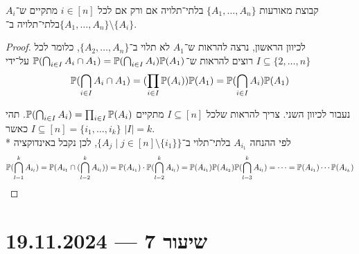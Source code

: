 \begin{proposition}
	קבוצת מאורעות $\{A_1, \dots, A_n\}$ בלתי־תלויה אם ורק אם לכל $i \in [n]$ מתקיים ש־$A_i$ בלתי־תלויה ב־$\{A_1, \dots, A_n\} \setminus \{A_i\}$.
\end{proposition}
\begin{proof}
	לכיוון הראשון, נרצה להראות ש־$A_1$ לא תלוי ב־$\{A_2, \dots, A_n\}$, כלומר לכל $I \subseteq \{2, \dots, n\}$ רוצים להראות ש־$\mathbb{P}(\bigcap_{i \in I} A_i \cap A_1) = \mathbb{P}(\bigcap_{i \in I} A_i) \mathbb{P}(A_1)$ על־ידי
	\[
		\mathbb{P}(\bigcap_{i \in I} A_i \cap A_1)
		= (\prod_{i \in I} \mathbb{P}(A_i)) \mathbb{P}(A_1)
		= \mathbb{P}(\bigcap_{i \in I} A_i) \mathbb{P}(A_1)
	\]

	נעבור לכיוון השני.
	צריך להראות שלכל $I \subseteq [n]$ מתקיים $\mathbb{P}(\bigcap_{i \in I} A_i) = \prod_{i \in I} \mathbb{P}(A_i)$.
	תהי $I \subseteq [n] = \{ i_1, \dots, i_k \}$ כאשר $|I| = k$. \\*
	לפי ההנחה $A_{i_1}$ בלתי־תלוי ב־$\{ A_j \mid j \in [n] \setminus \{ i_1 \}\}$, לכן נקבל באינדוקציה
	\[
		\mathbb{P}(\bigcap_{l = 1}^k A_{i_l})
		= \mathbb{P}(A_{i_1} \cap (\bigcap_{l = 2}^k A_{i_l}))
		= \mathbb{P}(A_{i_1}) \cdot \mathbb{P}(\bigcap_{l = 2}^k A_{i_l})
		= \mathbb{P}(A_{i_1}) \mathbb{P}(A_{i_2}) \mathbb{P}(\bigcap_{l = 3}^k A_{i_l})
		= \cdots = \mathbb{P}(A_{i_1}) \cdots \mathbb{P}(A_{i_k})
	\]
\end{proof}

\section{שיעור 7 --- 19.11.2024}

